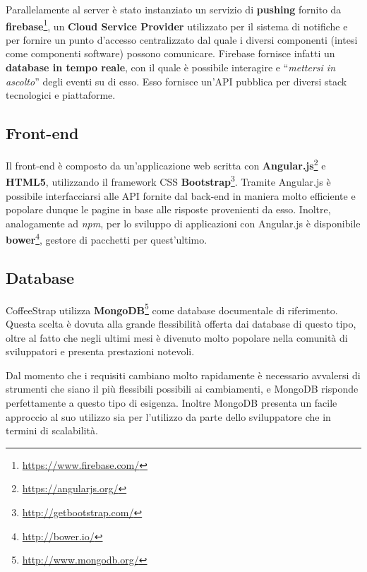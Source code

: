 Parallelamente al server è stato instanziato un servizio di \textbf{pushing} fornito da \textbf{firebase}\footnote{\url{https://www.firebase.com/}}, un \textbf{\gls{Cloud Service Provider}} utilizzato per il sistema di notifiche e per fornire un punto d'accesso centralizzato dal quale i diversi componenti (intesi come componenti software) possono comunicare. Firebase fornisce infatti un \textbf{database in tempo reale}, con il quale è possibile interagire e ``\textit{mettersi in ascolto}'' degli eventi su di esso. Esso fornisce un'API pubblica per diversi stack tecnologici e piattaforme.

\subsection{Front-end}

Il front-end è composto da un'applicazione web scritta con \textbf{\gls{Angular.js}}\footnote{\url{https://angularjs.org/}} e \textbf{\gls{HTML5}}, utilizzando il framework CSS \textbf{\gls{Bootstrap}}\footnote{\url{http://getbootstrap.com/}}. Tramite Angular.js è possibile interfacciarsi alle API fornite dal back-end in maniera molto efficiente e popolare dunque le pagine in base alle risposte provenienti da esso. Inoltre, analogamente ad \textit{npm}, per lo sviluppo di applicazioni con Angular.js è disponibile \textbf{bower}\footnote{\url{http://bower.io/}}, gestore di pacchetti per quest'ultimo.

\subsection{Database}

CoffeeStrap utilizza \textbf{\gls{MongoDB}}\footnote{\url{http://www.mongodb.org/}} come database documentale di riferimento. Questa scelta è dovuta alla grande flessibilità offerta dai database di questo tipo, oltre al fatto che negli ultimi mesi è divenuto molto popolare nella comunità di sviluppatori e presenta prestazioni notevoli. 

Dal momento che i requisiti cambiano molto rapidamente è necessario avvalersi di strumenti che siano il più flessibili possibili ai cambiamenti, e MongoDB risponde perfettamente a questo tipo di esigenza. Inoltre MongoDB presenta un facile approccio al suo utilizzo sia per l'utilizzo da parte dello sviluppatore che in termini di scalabilità.

